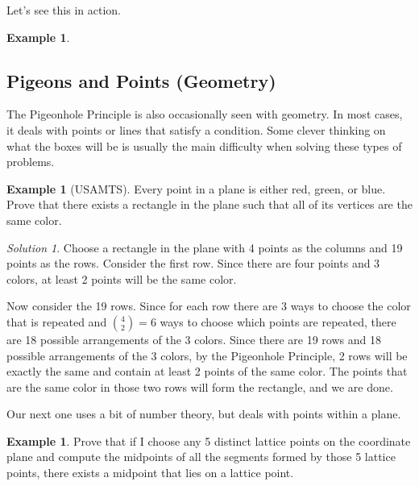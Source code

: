 \documentclass[l1pt]{article}
\theoremstyle{plain}
\theoremstyle{definition}
\newtheorem{example}[thm]{Example}
\theoremstyle{remark}
\newtheorem*{solution}{Solution}
\begin{document}
Let's see this in action.

\begin{example}

\end{example} 

\subsection{Pigeons and Points (Geometry)}

The Pigeonhole Principle is also occasionally seen with geometry. In most cases, it deals with points or lines that satisfy a condition. Some clever thinking on what the boxes will be is usually the main difficulty when solving these types of problems.

\begin{example}[USAMTS]
Every point in a plane is either red, green, or blue. Prove that there exists a rectangle in the plane such that all of its vertices are the same color.
\end{example}

\begin{solution}
Choose a rectangle in the plane with 4 points as the columns and 19 points as the rows. Consider the first row. Since there are four points and 3 colors, at least 2 points will be the same color. 

Now consider the 19 rows. Since for each row there are 3 ways to choose the color that is repeated and $\binom{4}{2}=6$ ways to choose which points are repeated, there are 18 possible arrangements of the 3 colors. Since there are 19 rows and 18 possible arrangements of the 3 colors, by the Pigeonhole Principle, 2 rows will be exactly the same and contain at least 2 points of the same color. The points that are the same color in those two rows will form the rectangle, and we are done.
\end{solution}

Our next one uses a bit of number theory, but deals with points within a plane.

\begin{example}
Prove that if I choose any 5 distinct lattice points on the coordinate plane and compute the midpoints of all the segments formed by those 5 lattice points, there exists a midpoint that lies on a lattice point.
\end{example}
\end{document}
